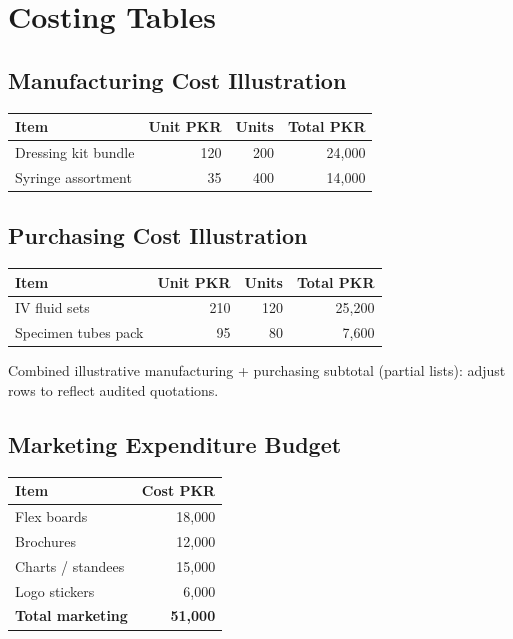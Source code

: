\documentclass[12pt,a4paper]{report}
\begin{document}
\section{Costing Tables}

\subsection*{Manufacturing Cost Illustration}
\begin{tabular}{@{}lrrr@{}}
\toprule
\textbf{Item} & \textbf{Unit PKR} & \textbf{Units} & \textbf{Total PKR} \\
\midrule
Dressing kit bundle & 120 & 200 & 24{,}000 \\
Syringe assortment & 35 & 400 & 14{,}000 \\
\bottomrule
\end{tabular}

\subsection*{Purchasing Cost Illustration}
\begin{tabular}{@{}lrrr@{}}
\toprule
\textbf{Item} & \textbf{Unit PKR} & \textbf{Units} & \textbf{Total PKR} \\
\midrule
IV fluid sets & 210 & 120 & 25{,}200 \\
Specimen tubes pack & 95 & 80 & 7{,}600 \\
\bottomrule
\end{tabular}

\noindent Combined illustrative manufacturing + purchasing subtotal (partial lists): adjust rows to reflect audited quotations.

\subsection*{Marketing Expenditure Budget}
\begin{tabular}{@{}l r@{}}
\toprule
\textbf{Item} & \textbf{Cost PKR} \\
\midrule
Flex boards & 18{,}000 \\
Brochures & 12{,}000 \\
Charts / standees & 15{,}000 \\
Logo stickers & 6{,}000 \\
\midrule
\textbf{Total marketing} & \textbf{51{,}000} \\
\bottomrule
\end{tabular}
\end{document}
